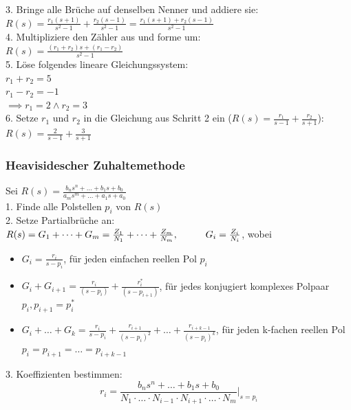 \documentclass[10pt,a4paper]{article}
\newcommand{\tab}[1][1]{\hspace*{#1cm}}
\begin{document}
3. Bringe alle Brüche auf denselben Nenner und addiere sie: \\
$R(s) = \frac{r_1(s + 1)}{s^2-1} + \frac{r_2(s - 1)}{s^2-1} = \frac{r_1(s + 1) + r_2(s - 1)}{s^2-1}$\\

4. Multipliziere den Zähler aus und forme um: \\
$ R(s) = \frac{(r_1 + r_2)s + (r_1 - r_2)}{s^2-1}$ \\

5. Löse folgendes lineare Gleichungssystem: \\
$r_1 + r_2 = 5$ \\
$r_1 - r_2 = -1$ \\
$\implies r_1 = 2 \land r_2 = 3$ \\

6. Setze $r_1$ und $r_2$ in die Gleichung aus Schritt 2 ein ($R(s) = \frac {r_1} {s - 1} + \frac {r_2} {s + 1}$): \\
$R(s) = \frac {2} {s - 1} + \frac {3} {s + 1}$

\subsubsection{Heavisidescher Zuhaltemethode}
Sei $R(s) = \frac{b_ns^n + \dots + b_1s + b_0}{a_ms^m + \dots + a_1s + a_0}$ \\

1. Finde alle Polstellen $p_i$ von $R(s)$ \\

2. Setze Partialbrüche an: \\
$R(s) = G_1 + \dots + G_m = \frac{Z_1}{N_1} + \dots + \frac{Z_m}{N_m}, \tab G_i = \frac{Z_i}{N_i}$, wobei
\begin{itemize}
	\item $G_i = \frac{r_i}{s - p_i}$, für jeden einfachen reellen Pol $p_i$
	\item $G_i + G_{i+1} = \frac{r_i}{(s - p_i)} + \frac{r_i^*}{(s - p_{i + 1})}$, für jedes konjugiert komplexes Polpaar $p_i, p_{i+1} = p_i^*$
	\item $G_i + \dots + G_k = \frac{r_i}{s - p_i} + \frac{r_{i+1}}{(s - p_i)^2} + \dots + \frac{r_{i + k - 1}}{(s - p_i)^k}$, für jeden k-fachen reellen Pol $p_i = p_{i+1} = \dots = p_{i + k - 1}$
\end{itemize}

3. Koeffizienten bestimmen: \\
$$
	r_i = \frac{b_ns^n + \dots + b_1s + b_0}{N_1 ⋅ \dots ⋅ N_{i-1} ⋅ N_{i+1} ⋅ \dots ⋅ N_{m}} \Bigg|_{s = p_i}
$$
\end{document}
